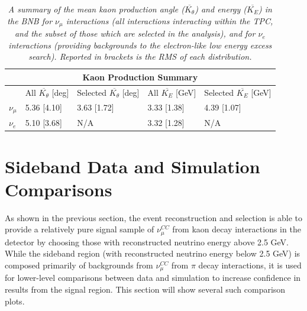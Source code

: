 \begin{table}
\begin{tabular}{ |p{0.5 cm}|p{2.5 cm}|p{4 cm}|p{3 cm}|p{3.5 cm}|  }
 \hline
 \multicolumn{5}{|c|}{Kaon Production Summary} \\
 \hline
   & All $\overline{K_\theta}$ [deg] & Selected $\overline{K_\theta}$ [deg] & All $\overline{K_E}$ [GeV] & Selected $\overline{K_E}$ [GeV]\\
 \hline \hline
 $\nu_\mu$ & 5.36 [4.10] & 3.63 [1.72] & 3.33 [1.38] & 4.39 [1.07] \\\hline
 $\nu_e$ & 5.10 [3.68] & N/A & 3.32 [1.28] & N/A \\\hline
 \hline
\end{tabular}
\caption{\textit{A summary of the mean kaon production angle ($\overline{K_\theta}$) and energy ($\overline{K_E}$) in the BNB for $\nu_\mu$ interactions (all interactions interacting within the TPC, and the subset of those which are selected in the analysis), and for $\nu_e$ interactions (providing backgrounds to the electron-like low energy excess search). Reported in brackets is the RMS of each distribution.}}\label{kaon_energy_angle_table}
\end{table}


















\section{Sideband Data and Simulation Comparisons}\label{kaon_sideband_data_mc_comparisons_section}
As shown in the previous section, the event reconstruction and selection is able to provide a relatively pure signal sample of $\nu_\mu^{CC}$ from kaon decay interactions in the detector by choosing those with reconstructed neutrino energy above 2.5 GeV. While the sideband region (with reconstructed neutrino energy below 2.5 GeV) is composed primarily of backgrounds from $\nu_\mu^{CC}$ from $\pi$ decay interactions, it is used for lower-level comparisons between data and simulation to increase confidence in results from the signal region. This section will show several such comparison plots.\\

